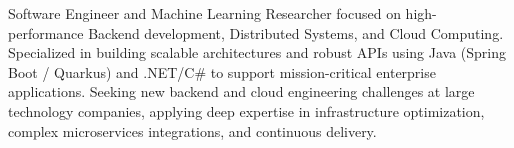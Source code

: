 Software Engineer and Machine Learning Researcher focused on high-performance Backend development, Distributed Systems, and Cloud Computing. %
Specialized in building scalable architectures and robust APIs using Java (Spring Boot / Quarkus) and .NET/C\# to support mission-critical enterprise applications. %
Seeking new backend and cloud engineering challenges at large technology companies, applying deep expertise in infrastructure optimization, complex microservices integrations, and continuous delivery.
